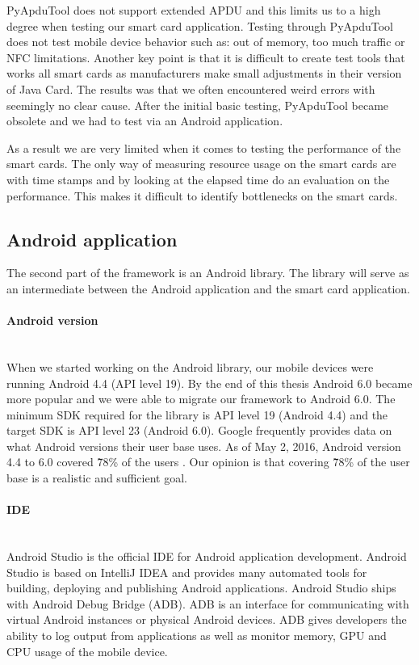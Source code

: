 PyApduTool does not support extended APDU and this limits us to a high degree when testing our smart card application. Testing through PyApduTool does not test mobile device behavior such as: out of memory, too much traffic or NFC limitations. Another key point is that it is difficult to create test tools that works all smart cards as manufacturers make small adjustments in their version of Java Card. The results was that we often encountered weird errors with seemingly no clear cause. After the initial basic testing, PyApduTool became obsolete and we had to test via an Android application.

As a result we are very limited when it comes to testing the performance of the smart cards. The only way of measuring resource usage on the smart cards are with time stamps and by looking at the elapsed time do an evaluation on the performance. This makes it difficult to identify bottlenecks on the smart cards.

\clearpage
\subsection{Android application}
The second part of the framework is an Android library. The library will serve as an intermediate between the Android application and the smart card application.

\paragraph{Android version}\mbox{}\\
When we started working on the Android library, our mobile devices were running Android 4.4 (API level 19). By the end of this thesis Android 6.0 became more popular and we were able to migrate our framework to Android 6.0. The minimum SDK required for the library is API level 19 (Android 4.4) and the target SDK is API level 23 (Android 6.0). Google frequently provides data on what Android versions their user base uses. As of May 2, 2016, Android version 4.4 to 6.0 covered \~78\% of the users \cite{AndroidAPIDistributions}. Our opinion is that covering \~78\% of the user base is a realistic and sufficient goal.

\paragraph{IDE}\mbox{}\\
Android Studio \cite{androidIDE} is the official IDE for Android application development. Android Studio is based on IntelliJ IDEA \cite{intelliJIDEA} and provides many automated tools for building, deploying and publishing Android applications. Android Studio ships with Android Debug Bridge (ADB). ADB is an interface for communicating with virtual Android instances or physical Android devices. ADB gives developers the ability to log output from applications as well as monitor memory, GPU and CPU usage of the mobile device.

